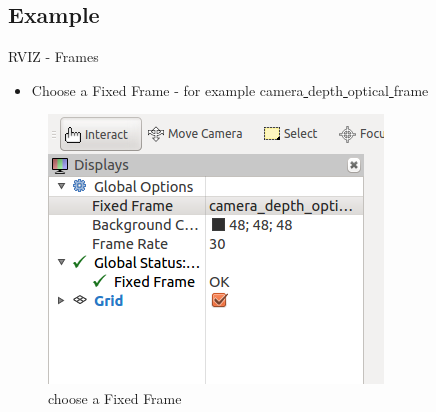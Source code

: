 \documentclass{beamer}
\begin{document}

\subsection{Example}
\begin{frame}{RVIZ - Frames}	

	\begin{itemize}
		\item Choose a Fixed Frame - for example camera\underline{ }depth\underline{ }optical\underline{ }frame
			
	\end{itemize}

	\begin{figure}[H]
		\centering
		\includegraphics[scale=0.5]{./Images/RVIZ_Frame.png}
		\caption{choose a Fixed Frame}
		\label{fig:ros_add_frame}
	\end{figure}
\end{frame}
\end{document}
